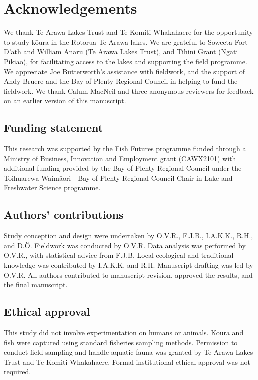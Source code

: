 \documentclass[
  12pt,
  a4paper,
]{scrbook}
\begin{document}

\chapter{Acknowledgements}\label{acknowledgements-1}

We thank Te Arawa Lakes Trust and Te Komiti Whakahaere for the
opportunity to study kōura in the Rotorua Te Arawa lakes. We are
grateful to Soweeta Fort-D'ath and William Anaru (Te Arawa Lakes Trust),
and Tihini Grant (Ngāti Pikiao), for facilitating access to the lakes
and supporting the field programme. We appreciate Joe Butterworth's
assistance with fieldwork, and the support of Andy Bruere and the Bay of
Plenty Regional Council in helping to fund the fieldwork. We thank Calum
MacNeil and three anonymous reviewers for feedback on an earlier version
of this manuscript.

\section{Funding statement}\label{funding-statement-1}

This research was supported by the Fish Futures programme funded through
a Ministry of Business, Innovation and Employment grant (CAWX2101) with
additional funding provided by the Bay of Plenty Regional Council under
the Toihuarewa Waimāori - Bay of Plenty Regional Council Chair in Lake
and Freshwater Science programme.

\section{Authors' contributions}\label{authors-contributions-1}

Study conception and design were undertaken by O.V.R., F.J.B., I.A.K.K.,
R.H., and D.Ö. Fieldwork was conducted by O.V.R. Data analysis was
performed by O.V.R., with statistical advice from F.J.B. Local
ecological and traditional knowledge was contributed by I.A.K.K. and
R.H. Manuscript drafting was led by O.V.R. All authors contributed to
manuscript revision, approved the results, and the final manuscript.

\section{Ethical approval}\label{ethical-approval-1}

This study did not involve experimentation on humans or animals. Kōura
and fish were captured using standard fisheries sampling methods.
Permission to conduct field sampling and handle aquatic fauna was
granted by Te Arawa Lakes Trust and Te Komiti Whakahaere. Formal
institutional ethical approval was not required.
\end{document}
